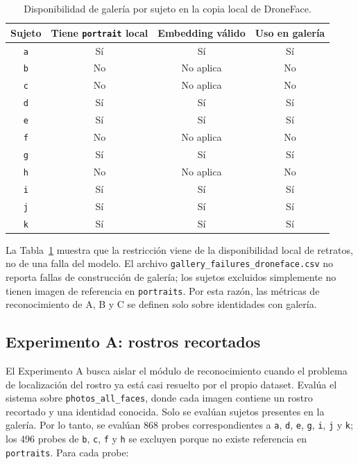 \documentclass[11pt]{article}
\begin{document}
\begin{table}[H]
\centering
\caption{Disponibilidad de galería por sujeto en la copia local de DroneFace.}
\label{tab:sujetos_galeria}
\begin{tabular}{cccc}
\toprule
Sujeto & Tiene \texttt{portrait} local & Embedding válido & Uso en galería \\
\midrule
\texttt{a} & Sí & Sí & Sí \\
\texttt{b} & No & No aplica & No \\
\texttt{c} & No & No aplica & No \\
\texttt{d} & Sí & Sí & Sí \\
\texttt{e} & Sí & Sí & Sí \\
\texttt{f} & No & No aplica & No \\
\texttt{g} & Sí & Sí & Sí \\
\texttt{h} & No & No aplica & No \\
\texttt{i} & Sí & Sí & Sí \\
\texttt{j} & Sí & Sí & Sí \\
\texttt{k} & Sí & Sí & Sí \\
\bottomrule
\end{tabular}
\end{table}

La Tabla~\ref{tab:sujetos_galeria} muestra que la restricción viene de la disponibilidad local de retratos, no de una falla del modelo. El archivo \texttt{gallery\_failures\_droneface.csv} no reporta fallas de construcción de galería; los sujetos excluidos simplemente no tienen imagen de referencia en \texttt{portraits}. Por esta razón, las métricas de reconocimiento de A, B y C se definen solo sobre identidades con galería.

\subsection{Experimento A: rostros recortados}

El Experimento A busca aislar el módulo de reconocimiento cuando el problema de localización del rostro ya está casi resuelto por el propio dataset. Evalúa el sistema sobre \texttt{photos\_all\_faces}, donde cada imagen contiene un rostro recortado y una identidad conocida. Solo se evalúan sujetos presentes en la galería. Por lo tanto, se evalúan 868 probes correspondientes a \texttt{a}, \texttt{d}, \texttt{e}, \texttt{g}, \texttt{i}, \texttt{j} y \texttt{k}; los 496 probes de \texttt{b}, \texttt{c}, \texttt{f} y \texttt{h} se excluyen porque no existe referencia en \texttt{portraits}. Para cada probe:
\end{document}

